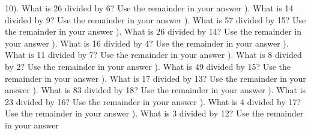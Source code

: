 \documentclass{article}%
\begin{document}
10). What is 26 divided by 6? Use the remainder in your answer%
\newline%
\newline%
). What is 14 divided by 9? Use the remainder in your answer%
\newline%
\newline%
). What is 57 divided by 15? Use the remainder in your answer%
\newline%
\newline%
). What is 26 divided by 14? Use the remainder in your answer%
\newline%
\newline%
). What is 16 divided by 4? Use the remainder in your answer%
\newline%
\newline%
). What is 11 divided by 7? Use the remainder in your answer%
\newline%
\newline%
). What is 8 divided by 2? Use the remainder in your answer%
\newline%
\newline%
). What is 49 divided by 15? Use the remainder in your answer%
\newline%
\newline%
). What is 17 divided by 13? Use the remainder in your answer%
\newline%
\newline%
). What is 83 divided by 18? Use the remainder in your answer%
\newline%
\newline%
). What is 23 divided by 16? Use the remainder in your answer%
\newline%
\newline%
). What is 4 divided by 17? Use the remainder in your answer%
\newline%
\newline%
). What is 3 divided by 12? Use the remainder in your answer%
\end{document}
